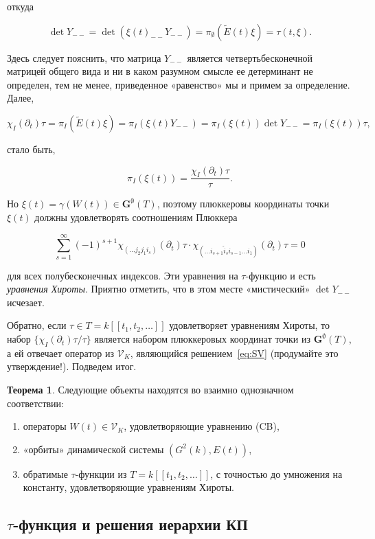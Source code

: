 \documentclass{article}
\theoremstyle{definition}
\newtheorem{theorem}{Теорема}[section]
\theoremstyle{definition} %
\theoremstyle{remark}     %
\theoremstyle{definition}
\theoremstyle{definition}
\theoremstyle{definition}
\theoremstyle{definition}
\theoremstyle{definition}
\theoremstyle{definition}
\theoremstyle{definition}
\theoremstyle{definition}
\begin{document}
откуда

\[
\det Y_{--} = \det(\xi(t)_{--}Y_{--}) = \pi_{\emptyset}(\tilde{E}(t)\xi) = \tau(t,\xi).
\]

Здесь следует пояснить, что матрица \(Y_{--}\) является четвертьбесконечной матрицей общего вида и ни в каком разумном смысле ее детерминант не определен, тем не менее, приведенное «равенство» мы и примем за определение. Далее,

\[
\chi_I(\partial_t)\tau = \pi_I(\tilde{E}(t)\xi) = \pi_I(\xi(t)Y_{--}) = \pi_I(\xi(t))\det Y_{--} = \pi_I(\xi(t))\tau,
\]

стало быть,

\[
\pi_I(\xi(t)) = \frac{\chi_I(\partial_t)\tau}{\tau}.
\]

Но \(\xi(t) = \gamma(W(t)) \in \mathbf{G}^{\emptyset}(T)\), поэтому плюккеровы координаты точки \(\xi(t)\) должны удовлетворять соотношениям Плюккера

\[
\sum_{s=1}^{\infty}(-1)^{s+1}\chi_{(\dots j_2 j_1 i_s)}(\partial_t)\tau \cdot \chi_{(\dots i_{s+1} \hat{i}_s i_{s-1} \dots i_1)}(\partial_t)\tau = 0
\]

для всех полубесконечных индексов. Эти уравнения на \(\tau\)-функцию и есть \textit{уравнения Хироты}. Приятно отметить, что в этом месте «мистический» \(\det Y_{--}\) исчезает.

Обратно, если \(\tau \in T = k[[t_1, t_2, \dots]]\) удовлетворяет уравнениям Хироты, то набор \(\{\chi_I(\partial_t)\tau/\tau\}\) является набором плюккеровых координат точки из \(\mathbf{G}^{\emptyset}(T)\), а ей отвечает оператор из \(\mathcal{V}_K\), являющийся решением~\ref{eq:SV} (продумайте это утверждение!). Подведем итог.

\begin{theorem}
  Следующие объекты находятся во взаимно однозначном соответствии:
  \begin{enumerate}
    \item операторы \( W(t) \in \mathcal{V}_K \), удовлетворяющие уравнению (CB),
    \item «орбиты» динамической системы \( (G^2(k), E(t)) \),
    \item обратимые \(\tau\)-функции из \( T = k[[t_1, t_2, \dots]] \), с точностью до умножения на константу, удовлетворяющие уравнениям Хироты.
  \end{enumerate}
\end{theorem}

\subsection{\(\tau\)-функция и решения иерархии КП}
\end{document}
